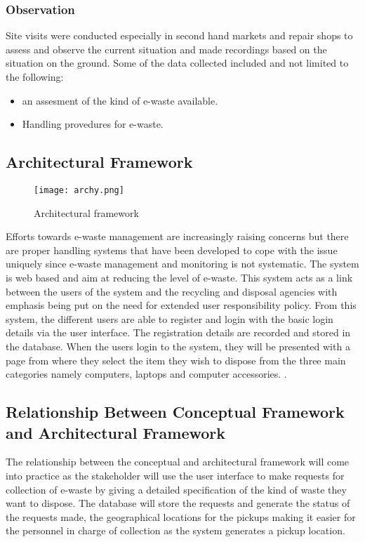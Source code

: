 \documentclass{article}
\begin{document}
\subsubsection{Observation}
Site visits were conducted especially in second hand markets and repair shops to assess and observe the current situation and made recordings based on the situation on the ground. Some of the data collected included and not limited to the following:
\begin{itemize}
\item an assesment of the kind of e-waste available.
\item Handling provedures for e-waste.
\end{itemize}
\newpage
\subsection{Architectural Framework}
\begin{figure}[h]
\texttt{[image: archy.png]}
\caption{Architectural framework}
\end{figure}
Efforts towards e-waste management are increasingly raising concerns but there are proper handling systems that have been developed to cope with the issue uniquely since e-waste management and monitoring is not systematic. The  system is web based and aim at reducing the level of e-waste. This system acts as a link between the users of the system and the recycling and disposal agencies with emphasis being put on the need for extended user responsibility policy.
From this system, the different users are able to register and login with the basic login details via the user interface. The registration details are recorded and stored in the database. When the users login to the system, they will be presented with a page from where they select the item they wish to dispose from the three main categories namely computers, laptops and computer accessories. .
\subsection{Relationship Between Conceptual Framework and Architectural Framework}
The relationship between the conceptual and architectural framework will come into practice as the stakeholder will use the user interface to make requests for collection of e-waste by giving a detailed specification of the kind of waste they want to dispose. The database will store the requests and generate the status of the requests made, the geographical locations for the pickups making it easier for the personnel in charge of collection as the system generates a pickup location.
\end{document}

